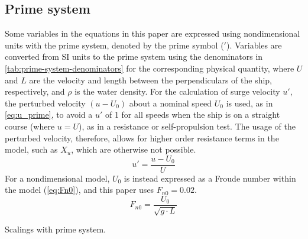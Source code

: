 \subsection{Prime system} \label{sec:prime_system}
Some variables in the equations in this paper are expressed using nondimensional units with the prime system, denoted by the prime symbol ($'$). Variables are converted from SI units to the prime system using the denominators in \autoref{tab:prime-system-denominators} for the corresponding physical quantity, where $U$ and $L$ are the velocity and length between the perpendiculars of the ship, respectively, and $\rho$ is the water density.
For the calculation of surge velocity $u'$, the perturbed velocity $(u-U_0)$ about a nominal speed $U_0$ is used, as in \autoref{eq:u_prime}, to avoid a $u'$ of 1 for all speeds when the ship is on a straight course (where $u=U$), as in a resistance or self-propulsion test. The usage of the perturbed velocity, therefore, allows for higher order resistance terms in the model, such as $X_{u}$, which are otherwise not possible. 
\begin{equation}
    \label{eq:u_prime}
    u' = \frac{u-U_0}{U}
\end{equation}
For a nondimensional model, $U_0$ is instead expressed as a Froude number within the model (\autoref{eq:Fn0}), and this paper uses $F_{n0}=0.02$.
\begin{equation}
    \label{eq:Fn0}
    F_{n0} = \frac{U_0}{\sqrt{g \cdot L}}
\end{equation}
\begin{table}[h]
    \centering
    \caption{Scalings with prime system.}
    \label{tab:prime-system-denominators}
\end{table}